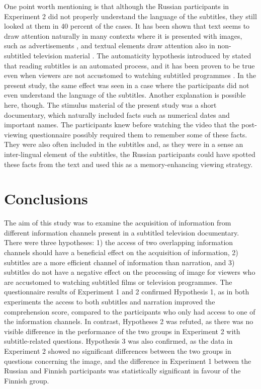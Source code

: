 \documentclass[output=paper]{langsci/langscibook}
\begin{document}
One point worth mentioning is that although the Russian participants in Experiment 2 did not properly understand the language of the subtitles, they still looked at them in 40 percent of the cases. It has been shown that text seems to draw attention naturally in many contexts where it is presented with images, such as advertisements \citep{rayner2001,rayner2008}, and textual elements draw attention also in non-subtitled television material \citep{tosi1997}. The automaticity hypothesis introduced by \citet{dydewalle1987} stated that reading subtitles is an automated process, and it has been proven to be true even when viewers are not accustomed to watching subtitled programmes \citep{dydewalle1991}. In the present study, the same effect was seen in a case where the participants did not even understand the language of the subtitles. Another explanation is possible here, though. The stimulus material of the present study was a short documentary, which naturally included facts such as numerical dates and important names. The participants knew before watching the video that the post-viewing questionnaire possibly required them to remember some of these facts. They were also often included in the subtitles and, as they were in a sense an inter-lingual element of the subtitles, the Russian participants could have spotted these facts from the text and used this as a memory-enhancing viewing strategy. 

\section{Conclusions}

The aim of this study was to examine the acquisition of information from different information channels present in a subtitled television documentary. There were three hypotheses: 1) the access of two overlapping information channels should have a beneficial effect on the acquisition of information, 2) subtitles are a more efficient channel of information than narration, and 3) subtitles do not have a negative effect on the processing of image for viewers who are accustomed to watching subtitled films or television programmes. The questionnaire results of Experiment 1 and 2 confirmed Hypothesis 1, as in both experiments the access to both subtitles and narration improved the comprehension score, compared to the participants who only had access to one of the information channels. In contrast, Hypotheses 2 was refuted, as there was no visible difference in the performance of the two groups in Experiment 2 with subtitle-related questions. Hypothesis 3 was also confirmed, as the data in Experiment 2 showed no significant differences between the two groups in questions concerning the image, and the difference in Experiment 1 between the Russian and Finnish participants was statistically significant in favour of the Finnish group. 
\end{document}
